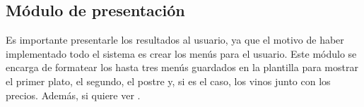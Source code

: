 % 

\subsection{Módulo de presentación}
Es importante presentarle los resultados al usuario, ya que el motivo de haber
implementado todo el sistema es crear los menús para el usuario. Este módulo se
encarga de formatear los hasta tres menús guardados en la plantilla
 para mostrar el primer plato, el segundo, el postre y,
si es el caso, los vinos junto con los precios. Además,  si quiere ver .
